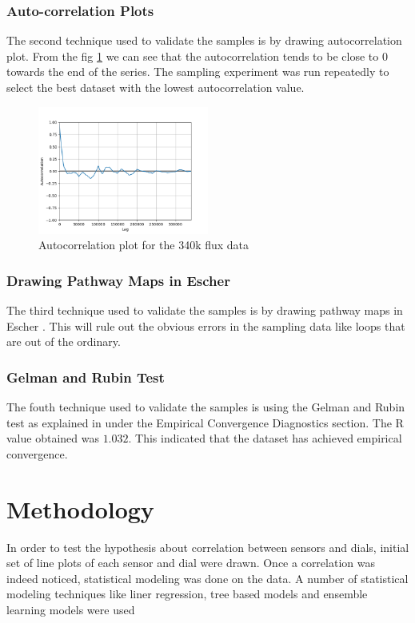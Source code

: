\documentclass[12pt,chapterheads]{ucsd}
\begin{document}
\subsection{Auto-correlation Plots}
The second technique used to validate the samples is by drawing autocorrelation plot. From the fig \ref{fig:acp} we can see that the autocorrelation tends to be close to 0 towards the end of the series. The sampling experiment was run repeatedly to select the best dataset with the lowest autocorrelation value.

\begin{figure}[h] 
\centering
\includegraphics[width=0.5\textwidth]{acp_330k}
\caption[Autocorrelation plot]
{Autocorrelation plot for the 340k flux data}
\label{fig:acp}
\end{figure}

\subsection{Drawing Pathway Maps in Escher}
The third technique used to validate the samples is by drawing pathway maps in Escher \cite{10.1371/journal.pcbi.1004321}. This will rule out the obvious errors in the sampling data like loops that are out of the ordinary. 

\subsection{Gelman and Rubin Test}
The fouth technique used to validate the samples is using the Gelman and Rubin test as explained in \cite{10.1371/journal.pone.0086587} under the Empirical Convergence Diagnostics section. The R value obtained was $1.032$. This indicated that the dataset has achieved empirical convergence. 

\chapter{Methodology}\label{chap:method}
In order to test the hypothesis about correlation between sensors and dials,
initial set of line plots of each sensor and dial were drawn. Once a correlation was indeed noticed, statistical modeling was done on the data. A number of statistical modeling techniques like liner regression, tree based models and ensemble learning models were used 
\end{document}
